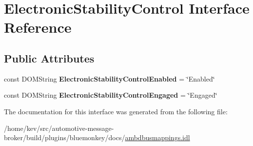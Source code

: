 \hypertarget{interfaceElectronicStabilityControl}{\section{Electronic\+Stability\+Control Interface Reference}
\label{interfaceElectronicStabilityControl}
}
\subsection*{Public Attributes}
\begin{DoxyCompactItemize}
\item 
\hypertarget{interfaceElectronicStabilityControl_ac3d84aeef9a83ecbe089b3410a3d0b56}{const D\+O\+M\+String {\bfseries Electronic\+Stability\+Control\+Enabled} = \char`\"{}Enabled\char`\"{}}\label{interfaceElectronicStabilityControl_ac3d84aeef9a83ecbe089b3410a3d0b56}

\item 
\hypertarget{interfaceElectronicStabilityControl_a9932a7220a5f9ef38d1ec59a0883c331}{const D\+O\+M\+String {\bfseries Electronic\+Stability\+Control\+Engaged} = \char`\"{}Engaged\char`\"{}}\label{interfaceElectronicStabilityControl_a9932a7220a5f9ef38d1ec59a0883c331}

\end{DoxyCompactItemize}


The documentation for this interface was generated from the following file\+:\begin{DoxyCompactItemize}
\item 
/home/kev/src/automotive-\/message-\/broker/build/plugins/bluemonkey/docs/\hyperlink{ambdbusmappings_8idl}{ambdbusmappings.\+idl}\end{DoxyCompactItemize}
